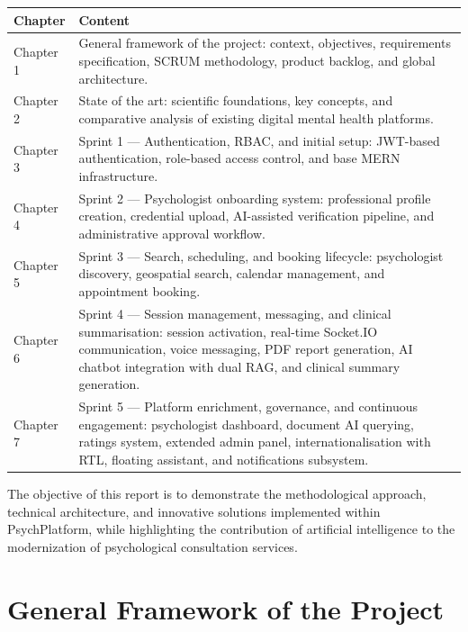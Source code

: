 \documentclass[a4paper,12pt]{report}
\renewcommand{\arraystretch}{1.25}
\begin{document}
\begin{center}
\renewcommand{\arraystretch}{1.4}
\begin{tabular}{|p{3cm}|p{10cm}|}
\hline
\textbf{Chapter} & \textbf{Content} \\ \hline
Chapter 1 & General framework of the project: context, objectives, requirements specification, SCRUM methodology, product backlog, and global architecture. \\ \hline
Chapter 2 & State of the art: scientific foundations, key concepts, and comparative analysis of existing digital mental health platforms. \\ \hline
Chapter 3 & Sprint 1 --- Authentication, RBAC, and initial setup: JWT-based authentication, role-based access control, and base MERN infrastructure. \\ \hline
Chapter 4 & Sprint 2 --- Psychologist onboarding system: professional profile creation, credential upload, AI-assisted verification pipeline, and administrative approval workflow. \\ \hline
Chapter 5 & Sprint 3 --- Search, scheduling, and booking lifecycle: psychologist discovery, geospatial search, calendar management, and appointment booking. \\ \hline
Chapter 6 & Sprint 4 --- Session management, messaging, and clinical summarisation: session activation, real-time Socket.IO communication, voice messaging, PDF report generation, AI chatbot integration with dual RAG, and clinical summary generation. \\ \hline
Chapter 7 & Sprint 5 --- Platform enrichment, governance, and continuous engagement: psychologist dashboard, document AI querying, ratings system, extended admin panel, internationalisation with RTL, floating assistant, and notifications subsystem. \\ \hline
\end{tabular}
\end{center}

\vspace{0.5cm}

The objective of this report is to demonstrate the methodological approach,
technical architecture, and innovative solutions implemented within
PsychPlatform, while highlighting the contribution of artificial intelligence
to the modernization of psychological consultation services.



\chapter{General Framework of the Project}
\end{document}

